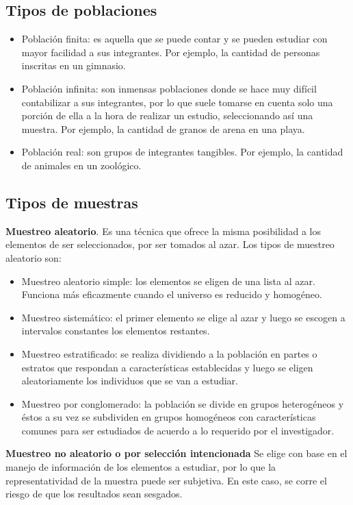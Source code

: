 \subsection{Tipos de poblaciones}

\begin{itemize} 
    \item Población finita: es aquella que se puede contar y se pueden
estudiar con mayor facilidad a sus integrantes. Por ejemplo, la cantidad de
personas inscritas en un gimnasio. 
    \item Población infinita: son inmensas poblaciones
donde se hace muy difícil contabilizar a sus integrantes, por lo que suele
tomarse en cuenta solo una porción de ella a la hora de realizar un estudio,
seleccionando así una muestra. Por ejemplo, la cantidad de granos de arena en
una playa. 
    \item Población real: son grupos de integrantes tangibles. Por ejemplo, la
cantidad de animales en un zoológico.
\end{itemize}

\subsection{Tipos de muestras}

\textbf{Muestreo aleatorio}. Es una técnica que ofrece la misma posibilidad a los
elementos de ser seleccionados, por ser tomados al azar. Los tipos de muestreo
aleatorio son:

\begin{itemize}

    \item Muestreo aleatorio simple: los elementos se eligen de una lista al azar.
Funciona más eficazmente cuando el universo es reducido y homogéneo. 

\item Muestreo sistemático: el primer elemento se elige al azar y luego se
escogen a intervalos constantes los elementos restantes. 

\item Muestreo estratificado: se realiza dividiendo a la población en partes o
estratos que respondan a características establecidas y luego se eligen
aleatoriamente los individuos que se van a estudiar. 

\item Muestreo por conglomerado: la población se divide en grupos heterogéneos y
éstos a su vez se subdividen en grupos homogéneos con características comunes
para ser estudiados de acuerdo a lo requerido por el investigador.

\end{itemize}

\textbf{Muestreo no aleatorio o por selección intencionada} Se elige con
base en el manejo de información de los elementos a estudiar, por lo que la
representatividad de la muestra puede ser subjetiva. En este caso, se corre el
riesgo de que los resultados sean sesgados.


